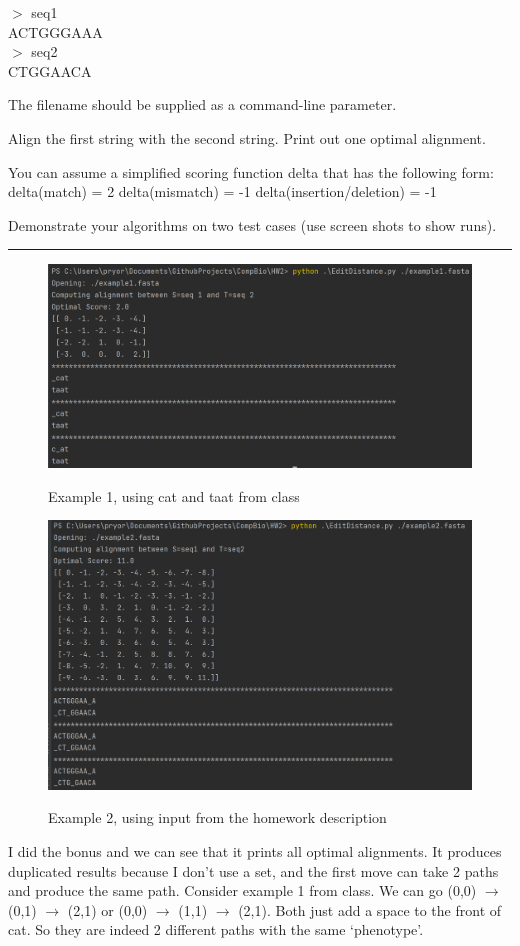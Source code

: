 \documentclass[11pt]{article}
\begin{document}
$>$ seq1\\
ACTGGGAAA\\
$>$ seq2\\
CTGGAACA

The filename should be supplied as a command-line parameter.

Align the first string with the second string.  Print out one optimal alignment.

You can assume a simplified scoring function delta that has the following form:
delta(match) = 2
delta(mismatch) = -1
delta(insertion/deletion) = -1

Demonstrate your algorithms on two test cases (use screen shots to show runs). 

\hrule

\begin{figure}[h]
    \centering
    \includegraphics[width=0.55 \linewidth]{./example1.png}
    \label{fig1}
    \caption{Example 1, using cat and taat from class}
\end{figure}

\begin{figure}[h]
    \centering
    \includegraphics[width=0.55 \linewidth]{./example2.png}
    \label{fig2}
    \caption{Example 2, using input from the homework description}
\end{figure}

I did the bonus and we can see that it prints all optimal alignments. 
It produces duplicated results because I don't use a set,
and the first move can take 2 paths and produce the same path.
Consider example 1 from class. We can go (0,0) $\rightarrow$ (0,1) $\rightarrow$ (2,1)
or (0,0) $\rightarrow$ (1,1) $\rightarrow$ (2,1). Both just add a space to the front of cat.
So they are indeed 2 different paths with the same `phenotype'. 

\lstset{style=mystyle}

\end{document}
